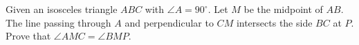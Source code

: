 Given an isosceles triangle $ ABC$ with $ \angle A = 90^{\circ}$. Let $ M$ be the midpoint of $ AB$. The line passing through $ A$ and perpendicular to $ CM$ intersects the side $ BC$ at $ P$. Prove that $ \angle AMC = \angle BMP$.